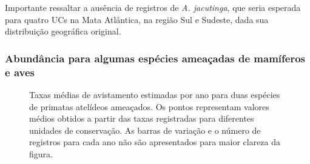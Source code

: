 \documentclass[
  letterpaper,
]{scrbook}
\begin{document}
Importante ressaltar a ausência de registros de \emph{A. jacutinga}, que
seria esperada para quatro UCs na Mata Atlântica, na região Sul e
Sudeste, dada sua distribuição geográfica original.

\subsubsection{Abundância para algumas espécies ameaçadas de mamíferos e
aves}\label{abunduxe2ncia-para-algumas-espuxe9cies-ameauxe7adas-de-mamuxedferos-e-aves}

\begin{figure}[H]


\caption{\label{fig-especies-ameacadas-atelideos}Taxas médias de
avistamento estimadas por ano para duas espécies de primatas atelídeos
ameaçados. Os pontos representam valores médios obtidos a partir das
taxas registradas para diferentes unidades de conservação. As barras de
variação e o número de registros para cada ano não são apresentados para
maior clareza da figura.}

\end{figure}%
\end{document}

